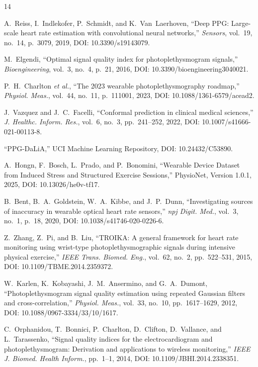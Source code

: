 \documentclass[conference]{IEEEtran}
\begin{document}
\begin{thebibliography}{14}

A.~Reiss, I.~Indlekofer, P.~Schmidt, and K.~Van~Laerhoven, ``Deep PPG: Large-scale heart rate estimation with convolutional neural networks,'' \emph{Sensors}, vol.~19, no.~14, p.~3079, 2019, DOI: 10.3390/s19143079.

M.~Elgendi, ``Optimal signal quality index for photoplethysmogram signals,'' \emph{Bioengineering}, vol.~3, no.~4, p.~21, 2016, DOI: 10.3390/bioengineering3040021.

P.~H.~Charlton \emph{et al.}, ``The 2023 wearable photoplethysmography roadmap,'' \emph{Physiol. Meas.}, vol.~44, no.~11, p.~111001, 2023, DOI: 10.1088/1361-6579/acead2.

J.~Vazquez and J.~C.~Facelli, ``Conformal prediction in clinical medical sciences,'' \emph{J. Healthc. Inform. Res.}, vol.~6, no.~3, pp.~241--252, 2022, DOI: 10.1007/s41666-021-00113-8.

``PPG-DaLiA,'' UCI Machine Learning Repository, DOI: 10.24432/C53890.

A.~Hongn, F.~Bosch, L.~Prado, and P.~Bonomini, ``Wearable Device Dataset from Induced Stress and Structured Exercise Sessions,'' PhysioNet, Version 1.0.1, 2025, DOI: 10.13026/he0v-tf17.

B.~Bent, B.~A.~Goldstein, W.~A.~Kibbe, and J.~P.~Dunn, ``Investigating sources of inaccuracy in wearable optical heart rate sensors,'' \emph{npj Digit. Med.}, vol.~3, no.~1, p.~18, 2020, DOI: 10.1038/s41746-020-0226-6.

Z.~Zhang, Z.~Pi, and B.~Liu, ``TROIKA: A general framework for heart rate monitoring using wrist-type photoplethysmographic signals during intensive physical exercise,'' \emph{IEEE Trans. Biomed. Eng.}, vol.~62, no.~2, pp.~522--531, 2015, DOI: 10.1109/TBME.2014.2359372.

W.~Karlen, K.~Kobayashi, J.~M.~Ansermino, and G.~A.~Dumont, ``Photoplethysmogram signal quality estimation using repeated Gaussian filters and cross-correlation,'' \emph{Physiol. Meas.}, vol.~33, no.~10, pp.~1617--1629, 2012, DOI: 10.1088/0967-3334/33/10/1617.

C.~Orphanidou, T.~Bonnici, P.~Charlton, D.~Clifton, D.~Vallance, and L.~Tarassenko, ``Signal quality indices for the electrocardiogram and photoplethysmogram: Derivation and applications to wireless monitoring,'' \emph{IEEE J. Biomed. Health Inform.}, pp.~1--1, 2014, DOI: 10.1109/JBHI.2014.2338351.


\end{thebibliography}
\end{document}
